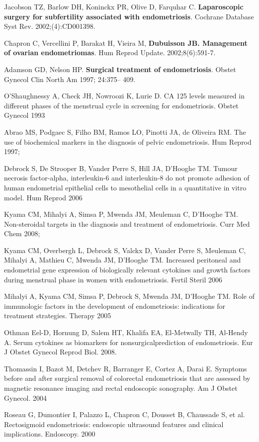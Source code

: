\documentclass[12pt]{article} %
\begin{document}
Jacobson TZ, Barlow DH, Koninckx PR, Olive D, Farquhar C.\textbf{ Laparoscopic surgery for subfertility associated with endometriosis}. Cochrane Database Syst Rev. 2002;(4):CD001398.


Chapron C, Vercellini P, Barakat H, Vieira M, \textbf{Dubuisson JB. Management of ovarian endometriomas}. Hum Reprod Update. 2002;8(6):591-7.

Adamson GD, Nelson HP. \textbf{Surgical treatment of endometriosis}. Obstet Gynecol Clin North Am 1997; 24:375– 409. 



O'Shaughnessy A, Check JH, Nowroozi K, Lurie D.
CA 125 levels measured in different phases of the menstrual cycle in screening for endometriosis. Obstet Gynecol 1993

Abrao MS, Podgaec S, Filho BM, Ramos LO, Pinotti JA, de Oliveira RM. The use of biochemical markers in the diagnosis of pelvic endometriosis. Hum Reprod 1997;

Debrock S, De Strooper B, Vander Perre S, Hill JA, D'Hooghe TM.
Tumour necrosis factor-alpha, interleukin-6 and interleukin-8 do not promote adhesion of human endometrial epithelial cells to mesothelial cells in a quantitative in vitro model. Hum Reprod 2006

Kyama CM, Mihalyi A, Simsa P, Mwenda JM, Meuleman C, D'Hooghe TM. Non-steroidal targets in the diagnosis and treatment of endometriosis. Curr Med Chem 2008;

Kyama CM, Overbergh L, Debrock S, Valckx D, Vander Perre S, Meuleman C, Mihalyi A, Mathieu C, Mwenda JM, D'Hooghe TM.
Increased peritoneal and endometrial gene expression of biologically relevant cytokines and growth factors during menstrual phase in women with endometriosis. Fertil Steril 2006

Mihalyi A, Kyama CM, Simsa P, Debrock S, Mwenda JM, D'Hooghe TM.
Role of immunologic factors in the development of endometriosis: indications for treatment strategies. Therapy 2005


Othman Eel-D, Hornung D, Salem HT, Khalifa EA, El-Metwally
TH, Al-Hendy A. Serum cytokines as biomarkers for nonsurgicalprediction of endometriosis. Eur J Obstet Gynecol Reprod Biol.
2008.

Thomassin I, Bazot M, Detchev R, Barranger E, Cortez A,
Darai E. Symptoms before and after surgical removal of
colorectal endometriosis that are assessed by magnetic
resonance imaging and rectal endoscopic sonography. Am J
Obstet Gynecol. 2004 

Roseau G, Dumontier I, Palazzo L, Chapron C, Dousset B,
Chaussade S, et al. Rectosigmoid endometriosis: endoscopic
ultrasound features and clinical implications. Endoscopy.
2000 
\end{document}
